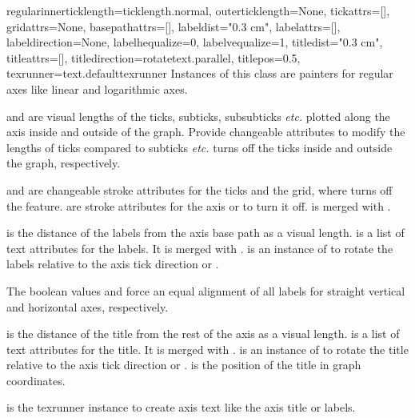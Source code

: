 \begin{classdesc}{regular}{innerticklength=ticklength.normal,
                           outerticklength=None,
                           tickattrs=[],
                           gridattrs=None,
                           basepathattrs=[],
                           labeldist="0.3 cm",
                           labelattrs=[],
                           labeldirection=None,
                           labelhequalize=0,
                           labelvequalize=1,
                           titledist="0.3 cm",
                           titleattrs=[],
                           titledirection=rotatetext.parallel,
                           titlepos=0.5,
                           texrunner=text.defaulttexrunner}
  Instances of this class are painters for regular axes like linear
  and logarithmic axes.

   and  are visual \PyX{}
  lengths of the ticks, subticks, subsubticks \emph{etc.} plotted
  along the axis inside and outside of the graph. Provide changeable
  attributes to modify the lengths of ticks compared to subticks
  \emph{etc.}  turns off the ticks inside and outside the
  graph, respectively.

   and  are changeable stroke attributes
  for the ticks and the grid, where  turns off the feature.
   are stroke attributes for the axis or
   to turn it off.  is merged with
  .

   is the distance of the labels from the axis base path
  as a visual \PyX{} length.  is a list of text
  attributes for the labels. It is merged with
  .
   is an instance of  to rotate
  the labels relative to the axis tick direction or .

  The boolean values  and 
  force an equal alignment of all labels for straight vertical and
  horizontal axes, respectively.

   is the distance of the title from the rest of the
  axis as a visual \PyX{} length.  is a list of text
  attributes for the title. It is merged with
  .
   is an instance of  to rotate
  the title relative to the axis tick direction or .
   is the position of the title in graph coordinates.

   is the texrunner instance to create axis text like
  the axis title or labels.
\end{classdesc}

